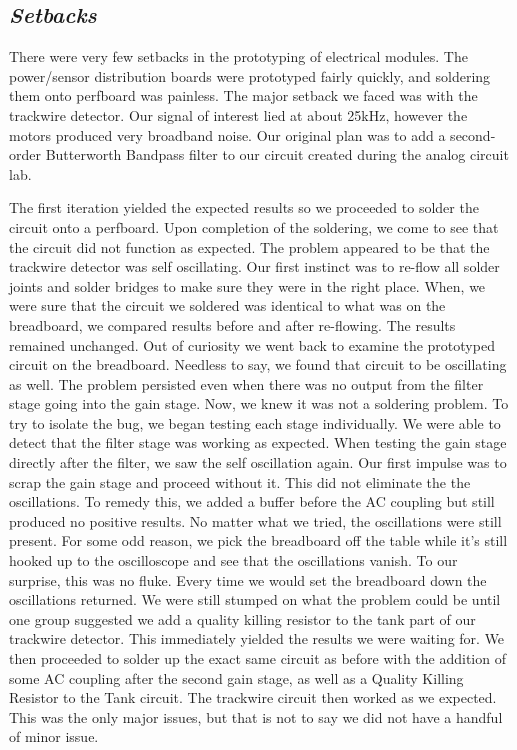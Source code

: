 \documentclass[]{article}
\begin{document}
\subsection*{\textit{Setbacks}}

There were very few setbacks in the prototyping of electrical modules. The power/sensor distribution boards were prototyped fairly quickly, and soldering them onto perfboard was painless. The major setback we faced was with the trackwire detector. Our signal of interest lied at about 25kHz, however the motors produced very broadband noise. Our original plan was to add a second-order Butterworth Bandpass filter to our circuit created during the analog circuit lab.

The first iteration yielded the expected results so we proceeded to solder the circuit onto a perfboard. Upon completion of the soldering, we come to see that the circuit did not function as expected. The problem appeared to be that the trackwire detector was self oscillating. Our first instinct was to re-flow all solder joints and solder bridges to make sure they were in the right place. When, we were sure that the circuit we soldered was identical to what was on the breadboard, we compared results before and after re-flowing. The results remained unchanged. Out of curiosity we went back to examine the prototyped circuit on the breadboard. Needless to say, we found that circuit to be oscillating as well. The problem persisted even when there was no output from the filter stage going into the gain stage. Now, we knew it was not a soldering problem. To try to isolate the bug, we began testing each stage individually. We were able to detect that the filter stage was working as expected. When testing the gain stage directly after the filter, we saw the self oscillation again. Our first impulse was to scrap the gain stage and proceed without it. This did not eliminate the the oscillations. To remedy this, we added a buffer before the AC coupling but still produced no positive results. No matter what we tried, the oscillations were still present. For some odd reason, we pick the breadboard off the table while it's still hooked up to the oscilloscope and see that the oscillations vanish. To our surprise, this was no fluke. Every time we would set the breadboard down the oscillations returned. We were still stumped on what the problem could be until one group suggested we add a quality killing resistor to the tank part of our trackwire detector. This immediately yielded the results we were waiting for. We then proceeded to solder up the exact same circuit as before with the addition of some AC coupling after the second gain stage, as well as a Quality Killing Resistor to the Tank circuit. The trackwire circuit then worked as we expected. This was the only major issues, but that is not to say we did not have a handful of minor issue. 
\end{document}
